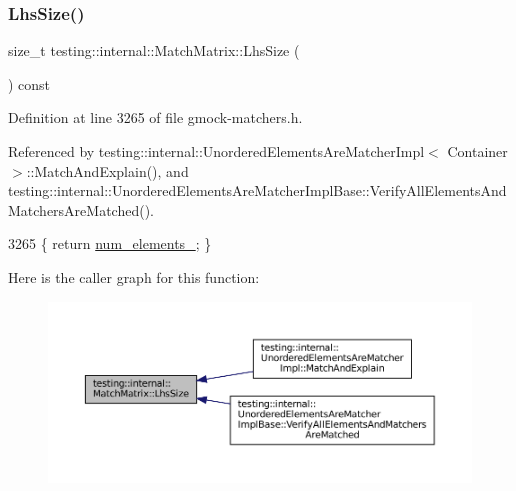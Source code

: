 \subsubsection{\texorpdfstring{Lhs\+Size()}{LhsSize()}}
{\footnotesize\ttfamily size\+\_\+t testing\+::internal\+::\+Match\+Matrix\+::\+Lhs\+Size (\begin{DoxyParamCaption}{ }\end{DoxyParamCaption}) const\hspace{0.3cm}{\ttfamily [inline]}}



Definition at line 3265 of file gmock-\/matchers.\+h.



Referenced by testing\+::internal\+::\+Unordered\+Elements\+Are\+Matcher\+Impl$<$ Container $>$\+::\+Match\+And\+Explain(), and testing\+::internal\+::\+Unordered\+Elements\+Are\+Matcher\+Impl\+Base\+::\+Verify\+All\+Elements\+And\+Matchers\+Are\+Matched().


\begin{DoxyCode}
3265 \{ \textcolor{keywordflow}{return} \hyperlink{classtesting_1_1internal_1_1MatchMatrix_a9e4eb268fa140a516390631cddc681db}{num\_elements\_}; \}
\end{DoxyCode}
Here is the caller graph for this function\+:
\nopagebreak
\begin{figure}[H]
\begin{center}
\leavevmode
\includegraphics[width=350pt]{classtesting_1_1internal_1_1MatchMatrix_a337d9793c61d985dbc1be166e34eed61_icgraph}
\end{center}
\end{figure}
\mbox{\label{classtesting_1_1internal_1_1MatchMatrix_a3a35e2d6107c225537d7e776465a7893}} 
